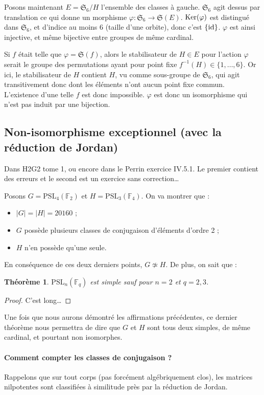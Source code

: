 \documentclass[a4paper, 11pt]{article}
\def\F{\mathbb{F}}
\def\Sigmap{\mathfrak{S}}
\def\Ker{\textnormal{Ker}}
\def\PSL{\mathrm{PSL}}
\newtheorem*{theorem}{Théorème}
\begin{document}
Posons maintenant $E = \Sigmap_6/H$ l'ensemble des classes à gauche. $\Sigmap_6$
agit dessus par translation ce qui donne un morphisme $\varphi : \Sigmap_6 \to
\Sigmap(E)$. $\Ker(\varphi)$ est distingué dans $\Sigmap_6$, et d'indice au moins 6
(taille d'une orbite), donc c'est $\{\textnormal{id}\}$. $\varphi$ est ainsi
injective, et même bijective entre groupes de même cardinal.

Si $f$ était telle que $\varphi = \Sigmap(f)$, alors le stabilisateur de $H \in E$
pour l'action $\varphi$ serait le groupe des permutations ayant pour point fixe
$f^{-1}(H) \in \{1,\ldots,6\}$. Or ici, le stabilisateur de $H$ contient $H$, vu
comme sous-groupe de $\Sigmap_6$, qui agit transitivement donc dont les éléments
n'ont aucun point fixe commun. L'existence d'une telle $f$ est donc impossible.
$\varphi$ est donc un isomorphisme qui n'est pas induit par une bijection.

\newpage

\subsection{Non-isomorphisme exceptionnel (avec la réduction de Jordan)}
\label{non-iso}

Dans H2G2 tome 1, ou encore dans le Perrin exercice IV.5.1. Le premier contient
des erreurs et le second est un exercice sans correction…

Posons $G = \PSL_4(\F_2)$ et $H = \PSL_3(\F_4)$. On va montrer que :
\begin{itemize}
\item $|G| = |H| = 20160$ ;
\item $G$ possède plusieurs classes de conjugaison d'éléments d'ordre 2 ;
\item $H$ n'en possède qu'une seule.
\end{itemize}
En conséquence de ces deux derniers points, $G \not\simeq H$. De plus, on sait
que :
\begin{theorem}
  $\PSL_n(\F_q)$ est simple sauf pour $n = 2$ et $q = 2,3$.
\end{theorem}
\begin{proof}
  C'est long…
\end{proof}
Une fois que nous aurons démontré les affirmations précédentes, ce dernier
théorème nous permettra de dire que $G$ et $H$ sont tous deux simples, de même
cardinal, et pourtant non isomorphes.

\paragraph{Comment compter les classes de conjugaison ?} Rappelons que sur tout
corps (pas forcément algébriquement clos), les matrices nilpotentes sont
classifiées à similitude près par la réduction de Jordan.
\end{document}
